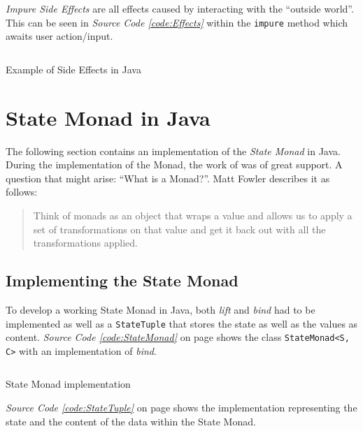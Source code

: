 \documentclass[a4paper,12pt,twoside]{scrreprt}
\begin{document}
\textit{Impure Side Effects} are all effects caused by interacting with the \enquote{outside world}. This can be seen in \textit{Source Code \ref{code:Effects}} within the \texttt{impure} method which awaits user action/input.

\begin{listing}[ht]
    \inputminted[fontsize=\footnotesize,linenos,breaklines,breakanywhere]{java}{./code/SideEffects.java}
    \caption[Example of Side Effects in Java]{Example of Side Effects in Java}
    \label{code:Effects}
\end{listing}

\clearpage

\section{State Monad in Java}
The following section contains an implementation of the \textit{State Monad} in Java. During the implementation of the Monad, the work of \cite{muzietto_state_2014} was of great support. A question that might arise: \enquote{What is a Monad?}. Matt Fowler describes it as follows: 
\begin{quote}
    Think of monads as an object that wraps a value and allows us to apply a set of transformations on that value and get it back out with all the transformations applied. \cite{fowler_understanding_2015}
\end{quote}

\subsection{Implementing the State Monad}
To develop a working State Monad in Java, both \textit{lift} and \textit{bind} had to be implemented as well as a \texttt{StateTuple} that stores the state as well as the values as content. \textit{Source Code \ref{code:StateMonad}} on page \pageref{code:StateMonad} shows the class \texttt{StateMonad<S, C>} with an implementation of \textit{bind}.

\begin{listing}[ht]
    \inputminted[fontsize=\footnotesize,linenos,breaklines,breakanywhere]{java}{./code/statemonad/StateMonad.java}
    \caption[State Monad implementation]{State Monad implementation}
    \label{code:StateMonad}
\end{listing}

\clearpage

\textit{Source Code \ref{code:StateTuple}} on page \pageref{code:StateTuple} shows the implementation representing the state and the content of the data within the State Monad.
\end{document}
